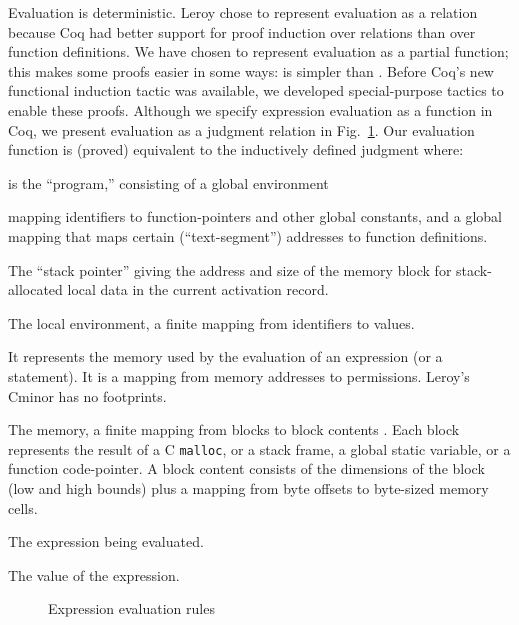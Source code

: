 \documentclass{llncs}
\newcommand{\cminor}{Cminor}
\newcommand{\tyface}[1]{\ensuremath{\mathsf{#1}}}
\newcommand{\Eval}{\tyface{Eval}}
\newcommand{\Evar}{\tyface{Evar}}
\newcommand{\Eop}{\tyface{Eop}}
\newcommand{\Eload}{\tyface{Eload}}
\newcommand{\fmap}{\Psi}
\newcommand{\infootprint}[4]{#4 \vdash \tyface{#3}_#2\, #1}
\newcommand{\evalexpr}[7]{#1;(#2;#3;#4;#5) \vdash #6 \Downarrow #7}
\newcommand{\evaloperation}[5]{#1;#2 \vdash #3(#4) \Downarrow_\tyface{eval\_operation} #5}
\newcommand{\loadv}[4]{#1\vdash #2\stackrel{#3}{\mapsto}#4}
\DeclareMathOperator{\dom}{dom}
\begin{document}
Evaluation is deterministic.
Leroy chose to represent evaluation as a relation because 
Coq had better
support for proof induction over relations than over function definitions.
We have chosen to represent
evaluation as a partial function; this makes some proofs easier
in some ways:  is simpler than .
Before Coq's new functional induction tactic was available, 
we developed special-purpose tactics to enable these proofs.
Although we specify expression evaluation as a function in Coq,
we present evaluation as a judgment relation in Fig.~\ref{evalexpr-fig}.
Our evaluation function is
(proved) equivalent to the inductively defined 
judgment 
where:
\begin{description}
\vspace{-7pt}
\item{} is the ``program,'' consisting of a global environment

mapping identifiers to function-pointers and other global constants,
and a global mapping 
that maps certain (``text-segment'') addresses to function definitions.
\item{}
The ``stack pointer'' giving the address and size of the memory block for 
stack-allocated local data in the current activation record.
\item{}
The local environment, a finite mapping
from identifiers to values.
\item{}
It represents the memory used by the evaluation of an expression (or a statement).
It is a mapping from  memory addresses to permissions.  Leroy's \cminor{} has no 
footprints.
\item{}
The memory, a finite mapping from blocks
to block contents \cite{blazy05:icfem}.  
Each block represents
the result of a C \texttt{malloc},
or a stack frame, a global static variable, or a function
code-pointer. 
A block content consists of the dimensions of the block (low and high bounds) 
plus a mapping from byte offsets to byte-sized memory cells.
\item{}
The expression being evaluated. 
\item{} The value of the expression.
\end{description}

\begin{figure}
\vspace{-35pt}
\vspace{-10pt}
\caption{Expression evaluation rules}
\label{evalexpr-fig}
\vspace{-10pt}
\end{figure}
\end{document}
